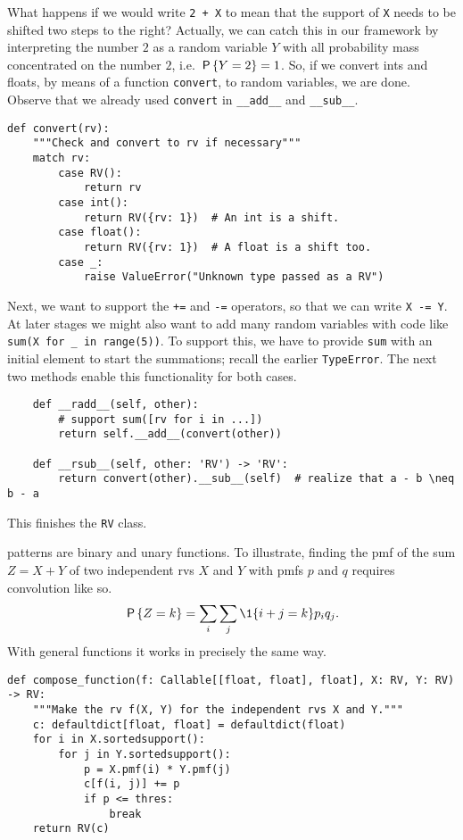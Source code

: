 \documentclass[stochastic-or]{subfiles}
\begin{document}
What happens if we would write \texttt{2 + X} to mean that the support of \texttt{X} needs to be shifted two steps to the right?
Actually, we can catch this in our framework by interpreting the number \(2\) as a random variable \(Y\) with all probability mass concentrated on the number \(2\), i.e.
\(\P{Y=2} = 1\). So, if we convert ints and floats, by means of a function \texttt{convert}, to random variables,  we are done. Observe that we already used \texttt{convert} in \texttt{\_\_add\_\_} and \texttt{\_\_sub\_\_}.
\begin{verbatim}
def convert(rv):
    """Check and convert to rv if necessary"""
    match rv:
        case RV():
            return rv
        case int():
            return RV({rv: 1})  # An int is a shift.
        case float():
            return RV({rv: 1})  # A float is a shift too.
        case _:
            raise ValueError("Unknown type passed as a RV")
\end{verbatim}


Next, we want to support the \texttt{+=} and \texttt{-=} operators, so that we can write \texttt{X -= Y}.
At later stages we might also want to add many random variables with code like \texttt{sum(X for \_ in range(5))}.
To support this, we have to provide \texttt{sum} with an initial element to start the summations; recall the earlier \texttt{TypeError}.
The next two methods enable this functionality for both cases.

\begin{verbatim}
    def __radd__(self, other):
        # support sum([rv for i in ...])
        return self.__add__(convert(other))

    def __rsub__(self, other: 'RV') -> 'RV':
        return convert(other).__sub__(self)  # realize that a - b \neq b - a
\end{verbatim}

This finishes the \texttt{RV} class.

 patterns are binary and unary functions.
To illustrate, finding the pmf of the sum \(Z=X+Y\) of two independent rvs \(X\) and \(Y\) with pmfs \(p\) and \(q\) requires convolution like so.
\begin{equation*}
\P{Z=k} = \sum_{i}\sum_j \1{i+j=k} p_i q_{j}.
\end{equation*}
With general functions it works in precisely the same way.
\begin{verbatim}
def compose_function(f: Callable[[float, float], float], X: RV, Y: RV) -> RV:
    """Make the rv f(X, Y) for the independent rvs X and Y."""
    c: defaultdict[float, float] = defaultdict(float)
    for i in X.sortedsupport():
        for j in Y.sortedsupport():
            p = X.pmf(i) * Y.pmf(j)
            c[f(i, j)] += p
            if p <= thres:
                break
    return RV(c)
\end{verbatim}
\end{document}
